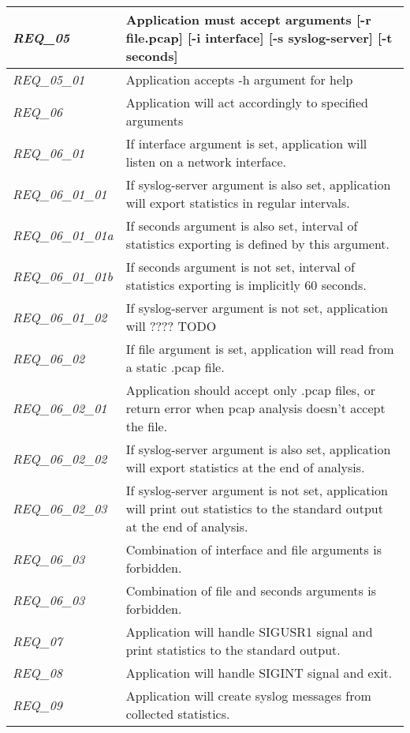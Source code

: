 \begin{table}[H]
{\begin{tabular}{@{}|l|l|@{}}
\textit{REQ\_05} & Application must accept arguments {[}-r file.pcap{]} {[}-i interface{]} {[}-s syslog-server{]} {[}-t seconds{]} \\ \midrule
\textit{REQ\_05\_01} & Application accepts -h argument for help \\ \midrule
\textit{REQ\_06} & Application will act accordingly to specified arguments \\ \midrule
\textit{REQ\_06\_01} & If interface argument is set, application will listen on a network interface. \\ \midrule
\textit{REQ\_06\_01\_01} & If syslog-server argument is also set, application will export statistics in regular intervals. \\ \midrule
\textit{REQ\_06\_01\_01a} & If seconds argument is also set, interval of statistics exporting is defined by this argument. \\ \midrule
\textit{REQ\_06\_01\_01b} & If seconds argument is not set, interval of statistics exporting is implicitly 60 seconds. \\ \midrule
\textit{REQ\_06\_01\_02} & If syslog-server argument is not set, application will ???? TODO \\ \midrule
\textit{REQ\_06\_02} & If file argument is set, application will read from a static .pcap file. \\ \midrule
\textit{REQ\_06\_02\_01} & Application should accept only .pcap files, or return error when pcap analysis doesn't accept the file. \\ \midrule
\textit{REQ\_06\_02\_02} & If syslog-server argument is also set, application will export statistics at the end of analysis. \\ \midrule
\textit{REQ\_06\_02\_03} & If syslog-server argument is not set, application will print out statistics to the standard output at the end of analysis. \\ \midrule
\textit{REQ\_06\_03} & Combination of interface and file arguments is forbidden. \\ \midrule
\textit{REQ\_06\_03} & Combination of file and seconds arguments is forbidden. \\ \midrule
\textit{REQ\_07} & Application will handle SIGUSR1 signal and print statistics to the standard output. \\ \midrule
\textit{REQ\_08} & Application will handle SIGINT signal and exit. \\ \midrule
\textit{REQ\_09} & Application will create syslog messages from collected statistics. \\ \midrule

\end{tabular}}
\end{table}
